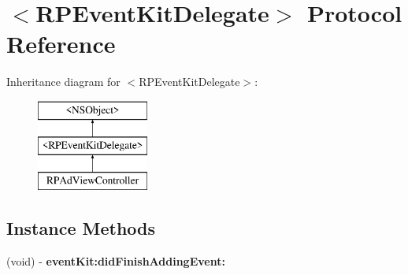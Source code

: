\hypertarget{protocol_r_p_event_kit_delegate-p}{\section{$<$R\-P\-Event\-Kit\-Delegate$>$ Protocol Reference}
\label{protocol_r_p_event_kit_delegate-p}
}
Inheritance diagram for $<$R\-P\-Event\-Kit\-Delegate$>$\-:\begin{figure}[H]
\begin{center}
\leavevmode
\includegraphics[height=3.000000cm]{protocol_r_p_event_kit_delegate-p}
\end{center}
\end{figure}
\subsection*{Instance Methods}
\begin{DoxyCompactItemize}
\item 
\hypertarget{protocol_r_p_event_kit_delegate-p_a7be37fc5f232b77c1b239fb7d9e913b0}{(void) -\/ {\bfseries event\-Kit\-:did\-Finish\-Adding\-Event\-:}}\label{protocol_r_p_event_kit_delegate-p_a7be37fc5f232b77c1b239fb7d9e913b0}

\end{DoxyCompactItemize}
